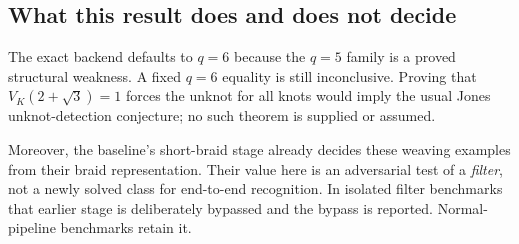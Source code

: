 \subsection{What this result does and does not decide}

The exact backend defaults to $q=6$ because the $q=5$ family is a proved
structural weakness. A fixed $q=6$ equality is still inconclusive.
Proving that $V_K(2+\sqrt3)=1$ forces the unknot for all knots would imply
the usual Jones unknot-detection conjecture; no such theorem is supplied or
assumed.

Moreover, the baseline's short-braid stage already decides these weaving
examples from their braid representation. Their value here is an adversarial
test of a \emph{filter}, not a newly solved class for end-to-end recognition.
In isolated filter benchmarks that earlier stage is deliberately bypassed
and the bypass is reported. Normal-pipeline benchmarks retain it.
